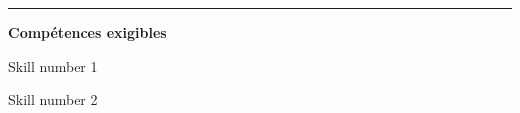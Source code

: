 \documentclass[12pt, a4paper]{article}
\begin{document}
\noindent\rule{\linewidth}{.7pt}\begin{center}{\large\bf Compétences exigibles}\end{center}

\begin{minipage}[c]{0.4\linewidth}\centering
Skill number 1\xspace\xspace\color{DarkOrange}\faMehO\color{black}
\end{minipage}\hfill
\begin{minipage}[c]{0.4\linewidth}\centering
Skill number 2\xspace\xspace\color{DarkRed}\faFrownO\color{black}
\end{minipage}
\newpage
\end{document}
